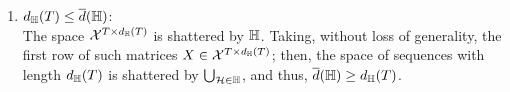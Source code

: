\begin{enumerate}
        \item  $ d_{\mathbb{H}}(T) \leq \overline{d}(\mathbb{H})$: \\
        The space 
        $\mathcal{X}^{T \times d_{\mathbb{H}}(T)}$ is shattered by $\mathbb{H}$. 
        Taking, without loss of generality, the first row of such matrices $X \in \mathcal{X}^{T \times d_{\mathbb{H}}(T)}$; 
        then, the space of sequences with length $d_{\mathbb{H}}(T)$ is shattered by $\bigcup_{\mathcal{H} \in \mathbb{H}}$, and thus, $\overline{d}(\mathbb{H}) \geq d_{\mathbb{H}}(T)$.


    \end{enumerate}


